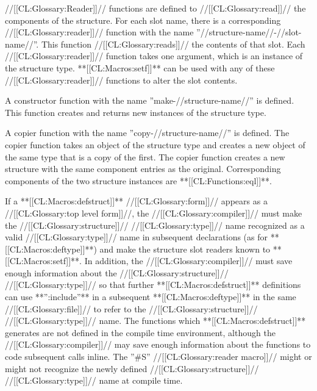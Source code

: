 
//[[CL:Glossary:Reader]]// functions are defined to //[[CL:Glossary:read]]// the components of the structure. For each slot name, there is a corresponding //[[CL:Glossary:reader]]// function with the name ''//structure-name//-//slot-name//''. This function //[[CL:Glossary:reads]]// the contents of that slot. Each //[[CL:Glossary:reader]]// function takes one argument, which is an instance of the structure type. **[[CL:Macros:setf]]** can be used with any of these //[[CL:Glossary:reader]]// functions to alter the slot contents.


A constructor function with the name ''make-//structure-name//'' is defined. This function creates and returns new instances of the structure type.


A copier function with the name ''copy-//structure-name//'' is defined. The copier function takes an object of the structure type and creates a new object of the same type that is a copy of the first. The copier function creates a new structure with the same component entries as the original. Corresponding components of the two structure instances are **[[CL:Functions:eql]]**. \endlist

If a **[[CL:Macros:defstruct]]** //[[CL:Glossary:form]]// appears as a //[[CL:Glossary:top level form]]//, the //[[CL:Glossary:compiler]]// must make the //[[CL:Glossary:structure]]// //[[CL:Glossary:type]]// name recognized as a valid //[[CL:Glossary:type]]// name in subsequent declarations (as for **[[CL:Macros:deftype]]**) and make the structure slot readers known to **[[CL:Macros:setf]]**. In addition, the //[[CL:Glossary:compiler]]// must save enough information about the //[[CL:Glossary:structure]]// //[[CL:Glossary:type]]// so that further **[[CL:Macros:defstruct]]** definitions can use **'':include''** in a subsequent **[[CL:Macros:deftype]]** in the same //[[CL:Glossary:file]]// to refer to the //[[CL:Glossary:structure]]// //[[CL:Glossary:type]]// name. The functions which **[[CL:Macros:defstruct]]** generates are not defined in the compile time environment, although the //[[CL:Glossary:compiler]]// may save enough information about the functions to code subsequent calls inline. The ''#S'' //[[CL:Glossary:reader macro]]// might or might not recognize the newly defined //[[CL:Glossary:structure]]// //[[CL:Glossary:type]]// name at compile time.

